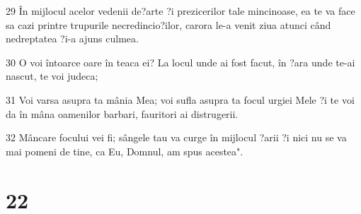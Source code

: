 \par 29 În mijlocul acelor vedenii de?arte ?i prezicerilor tale mincinoase, ea te va face sa cazi printre trupurile necredincio?ilor, carora le-a venit ziua atunci când nedreptatea ?i-a ajuns culmea.
\par 30 O voi întoarce oare în teaca ei? La locul unde ai fost facut, în ?ara unde te-ai nascut, te voi judeca;
\par 31 Voi varsa asupra ta mânia Mea; voi sufla asupra ta focul urgiei Mele ?i te voi da în mâna oamenilor barbari, fauritori ai distrugerii.
\par 32 Mâncare focului vei fi; sângele tau va curge în mijlocul ?arii ?i nici nu se va mai pomeni de tine, ca Eu, Domnul, am spus acestea".

\chapter{22}

